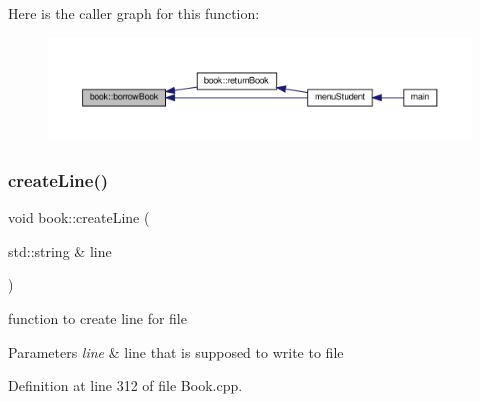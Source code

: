 Here is the caller graph for this function\+:
\nopagebreak
\begin{figure}[H]
\begin{center}
\leavevmode
\includegraphics[width=350pt]{classbook_a68bc47d79edd93594d50f720be2653f6_icgraph}
\end{center}
\end{figure}
\mbox{\label{classbook_aea835c54459ec0a4d29d42f2f6f7858d}} 
\subsubsection{\texorpdfstring{create\+Line()}{createLine()}}
{\footnotesize\ttfamily void book\+::create\+Line (\begin{DoxyParamCaption}\item[{std\+::string \&}]{line }\end{DoxyParamCaption})}

function to create line for file 
\begin{DoxyParams}{Parameters}
{\em line} & line that is supposed to write to file \\
\hline
\end{DoxyParams}


Definition at line 312 of file Book.\+cpp.


